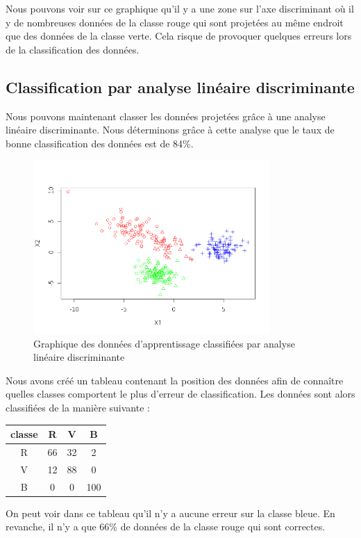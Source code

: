 \documentclass[a4paper,11pt]{article}
\begin{document}
  Nous pouvons voir sur ce graphique qu'il y a une zone sur l'axe discriminant où il y de nombreuses
  données de la classe rouge qui sont projetées au même endroit que des données de la classe verte.
  Cela risque de provoquer quelques erreurs lors de la classification des données.
  
  \subsection{Classification par analyse linéaire discriminante}
  
  Nous pouvons maintenant classer les données projetées grâce à une analyse linéaire discriminante. Nous 
  déterminons grâce à cette analyse que le taux de bonne classification des données est de 84\%.
  
  \begin{figure}[H]
  \center
   \includegraphics[width=9cm]{apprentissage_classifie.png}
   \caption{Graphique des données d'apprentissage classifiées par analyse linéaire discriminante}
  \end{figure}

  Nous avons créé un tableau contenant la position des données afin de connaître quelles classes
  comportent le plus d'erreur de classification. Les données sont alors classifiées de la manière suivante :
  \begin{center}
  \begin{tabular}{|c|c|c|c|}
   \hline
   classe & R & V & B\\
   \hline
   R & 66 & 32 & 2 \\
   \hline
   V & 12 & 88 & 0 \\
   \hline
   B & 0 & 0 & 100 \\
   \hline
  \end{tabular}
  \end{center}

  On peut voir dans ce tableau qu'il n'y a aucune erreur sur la classe bleue. En revanche, il n'y a que 66\%
  de données de la classe rouge qui sont correctes.\\
  
\end{document}
